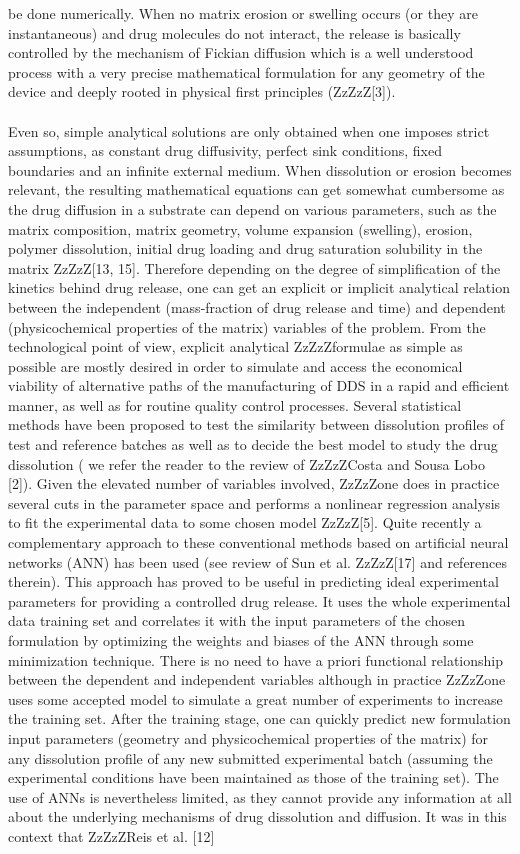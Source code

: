\documentclass{article}%
\begin{document}
be done numerically. When no matrix erosion or swelling occurs (or they are instantaneous)
and drug molecules do not interact, the release is basically controlled by the mechanism of
Fickian diffusion which is a well understood process with a very precise mathematical formulation
for any geometry of the device and deeply rooted in physical first principles (ZzZzZ[3]).
\\
\\Even so, simple analytical solutions are only obtained when one imposes strict assumptions,
as constant drug diffusivity, perfect sink conditions, fixed boundaries and an infinite external
medium. When dissolution or erosion becomes relevant, the resulting mathematical
equations can get somewhat cumbersome as the drug diffusion in a substrate can depend
on various parameters, such as the matrix composition, matrix geometry, volume expansion
(swelling), erosion, polymer dissolution, initial drug loading and drug saturation solubility
in the matrix ZzZzZ[13, 15]. Therefore depending on the degree of simplification of the kinetics
behind drug release, one can get an explicit or implicit analytical relation between the independent
(mass-fraction of drug release and time) and dependent (physicochemical properties
of the matrix) variables of the problem.
From the technological point of view, explicit analytical ZzZzZformulae as simple as possible are
mostly desired in order to simulate and access the economical viability of alternative paths
of the manufacturing of DDS in a rapid and efficient manner, as well as for routine quality
control processes. Several statistical methods have been proposed to test the similarity between
dissolution profiles of test and reference batches as well as to decide the best model to
study the drug dissolution ( we refer the reader to the review of ZzZzZCosta and Sousa Lobo [2]).
Given the elevated number of variables involved, ZzZzZone does in practice several cuts in the
parameter space and performs a nonlinear regression analysis to fit the experimental data
to some chosen model ZzZzZ[5]. Quite recently a complementary approach to these conventional
methods based on artificial neural networks (ANN) has been used (see review of Sun et al.
ZzZzZ[17] and references therein). This approach has proved to be useful in predicting ideal experimental
parameters for providing a controlled drug release. It uses the whole experimental
data training set and correlates it with the input parameters of the chosen formulation by
optimizing the weights and biases of the ANN through some minimization technique. There
is no need to have a priori functional relationship between the dependent and independent
variables although in practice ZzZzZone uses some accepted model to simulate a great number of
experiments to increase the training set. After the training stage, one can quickly predict
new formulation input parameters (geometry and physicochemical properties of the matrix)
for any dissolution profile of any new submitted experimental batch (assuming the experimental
conditions have been maintained as those of the training set). The use of ANNs
is nevertheless limited, as they cannot provide any information at all about the underlying
mechanisms of drug dissolution and diffusion. It was in this context that ZzZzZReis et al. [12]
\end{document}
